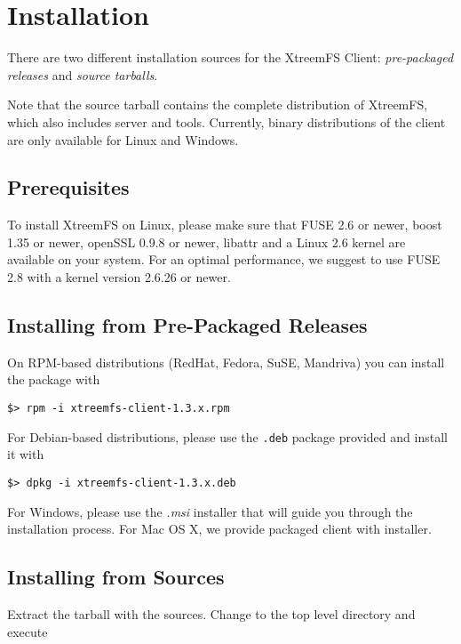\documentclass[a4paper,10pt]{book}
\begin{document}
\section{Installation}
\label{sec:client_installation}

There are two different installation sources for the XtreemFS Client: \emph{pre-packaged releases} and \emph{source tarballs}.

Note that the source tarball contains the complete distribution of XtreemFS, which also includes server and tools. Currently, binary distributions of the client are only available for Linux and Windows.

\subsection{Prerequisites}

To install XtreemFS on Linux, please make sure that FUSE 2.6 or newer, boost 1.35 or newer, openSSL 0.9.8 or newer, libattr and a Linux 2.6 kernel are available on your system. For an optimal performance, we suggest to use FUSE 2.8 with a kernel version 2.6.26 or newer.

\subsection{Installing from Pre-Packaged Releases}

On RPM-based distributions (RedHat, Fedora, SuSE, Mandriva) you can install the package with

\begin{verbatim}
$> rpm -i xtreemfs-client-1.3.x.rpm
\end{verbatim}


For Debian-based distributions, please use the \texttt{.deb} package provided and install it with

\begin{verbatim}
$> dpkg -i xtreemfs-client-1.3.x.deb
\end{verbatim}


For Windows, please use the \emph{.msi} installer that will guide you through the installation process.
For Mac OS X, we provide packaged client with installer.

\subsection{Installing from Sources}

Extract the tarball with the sources. Change to the top level directory and execute
\end{document}
